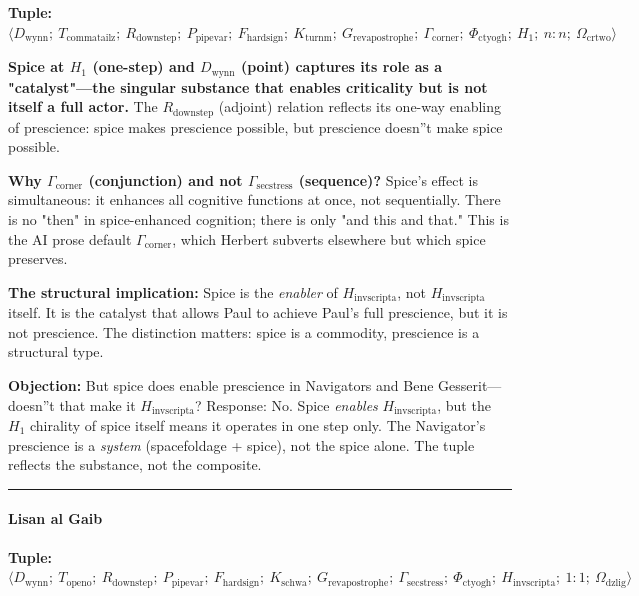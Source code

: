 \documentclass[12pt,a4paper]{article}
\begin{document}
\textbf{Tuple:} $\langle D_{\text{wynn}};\ T_{\text{commatailz}};\ R_{\text{downstep}};\ P_{\text{pipevar}};\ F_{\text{hardsign}};\ K_{\text{turnm}};\ G_{\text{revapostrophe}};\ \Gamma_{\text{corner}};\ \Phi_{\text{ctyogh}};\ H_1;\ n{:}n;\ \Omega_{\text{crtwo}} \rangle$

\textbf{Spice at $H_1$ (one-step) and $D_{\text{wynn}}$ (point) captures its role as a "catalyst"---the singular substance that enables criticality but is not itself a full actor.} The $R_{\text{downstep}}$ (adjoint) relation reflects its one-way enabling of prescience: spice makes prescience possible, but prescience doesn''t make spice possible.

\textbf{Why $\Gamma_{\text{corner}}$ (conjunction) and not $\Gamma_{\text{secstress}}$ (sequence)?} Spice's effect is simultaneous: it enhances all cognitive functions at once, not sequentially. There is no "then" in spice-enhanced cognition; there is only "and this and that." This is the AI prose default $\Gamma_{\text{corner}}$, which Herbert subverts elsewhere but which spice preserves.

\textbf{The structural implication:} Spice is the \emph{enabler} of $H_{\text{invscripta}}$, not $H_{\text{invscripta}}$ itself. It is the catalyst that allows Paul to achieve Paul's full prescience, but it is not prescience. The distinction matters: spice is a commodity, prescience is a structural type.

\textbf{Objection:} But spice does enable prescience in Navigators and Bene Gesserit---doesn''t that make it $H_{\text{invscripta}}$? Response: No. Spice \emph{enables} $H_{\text{invscripta}}$, but the $H_1$ chirality of spice itself means it operates in one step only. The Navigator's prescience is a \emph{system} (spacefoldage + spice), not the spice alone. The tuple reflects the substance, not the composite.

\begin{center}
\rule{0.5\textwidth}{0.4pt}
\end{center}

\paragraph{Lisan al Gaib}

\textbf{Tuple:} $\langle D_{\text{wynn}};\ T_{\text{openo}};\ R_{\text{downstep}};\ P_{\text{pipevar}};\ F_{\text{hardsign}};\ K_{\text{schwa}};\ G_{\text{revapostrophe}};\ \Gamma_{\text{secstress}};\ \Phi_{\text{ctyogh}};\ H_{\text{invscripta}};\ 1{:}1;\ \Omega_{\text{dzlig}} \rangle$
\end{document}
